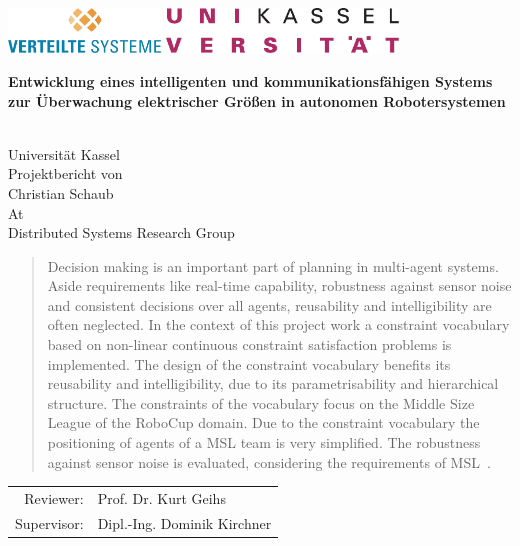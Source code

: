 \documentclass[
	11pt,								%
	a4paper,						%
	oneside,						%
	titlepage,					%
	headsepline,				%
	DIV13,							%
	abstracton,	 				%
	BCOR0cm,						%
	bibliography=totoc, %
]{scrreprt}							%
\begin{document}
	\thispagestyle{empty}
	\includegraphics[height=1.2cm]{images/vsLogo.png}
	\hfill\includegraphics[height=1.2cm]{images/uniLogo.pdf}\\[1cm]

	\begin{center}
		\begin{LARGE}\bfseries Entwicklung eines intelligenten und kommunikationsfähigen Systems zur Überwachung elektrischer Größen 
					in autonomen Robotersystemen\end{LARGE}\\
		[2cm]
		\Large{Universität Kassel}\\
		[1cm]
		\large{Projektbericht von}\\
		\Large{Christian Schaub}\\
		[1cm]
		\large{At}\\ \Large{Distributed Systems Research Group}\\
		[1cm]
	\end{center}
	\begin{abstract}
Decision making is an important part of planning in multi-agent systems. Aside requirements like real-time capability, robustness against sensor noise and consistent decisions over all agents, reusability and intelligibility are often neglected. In the context of this project work a constraint vocabulary based on non-linear continuous constraint satisfaction problems is implemented. The design of the constraint vocabulary benefits its reusability and intelligibility, due to its parametrisability and hierarchical structure. The constraints of the vocabulary focus on the  Middle Size League of the RoboCup  domain. Due to the constraint vocabulary the positioning of agents of a MSL team is very simplified. The robustness against sensor noise is evaluated, considering the requirements of MSL~\cite{Aiello2007}.
	\end{abstract}

	\vfill
	\begin{Large}
		\begin{tabular}{r l}
			Reviewer: & Prof. Dr. Kurt Geihs\\
			[1cm]
			Supervisor: & Dipl.-Ing. Dominik Kirchner\\
		\end{tabular}
	\end{Large}
	\vfill
\end{document}
